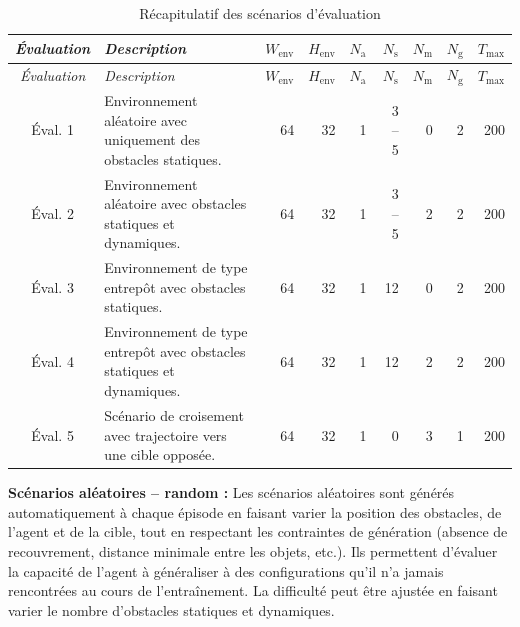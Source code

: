 \begin{longtable}{c p{6.5cm} r r r r r r r}

    \caption{Récapitulatif des scénarios d'évaluation} \label{tab:eval_scenarios}                                                                                                                                             \\
    \toprule
    \textit{Évaluation} & \textit{Description}                                                   & $W_{\text{env}}$ & $H_{\text{env}}$ & $N_{\text{a}}$ & $N_{\text{s}}$ & $N_{\text{m}}$ & $N_{\text{g}}$ & $T_{\text{max}}$ \\
    \midrule
    \endfirsthead
    \toprule
    \textit{Évaluation} & \textit{Description}                                                   & $W_{\text{env}}$ & $H_{\text{env}}$ & $N_{\text{a}}$ & $N_{\text{s}}$ & $N_{\text{m}}$ & $N_{\text{g}}$ & $T_{\text{max}}$ \\
    \midrule
    \endhead
    \midrule
    \endfoot
    \bottomrule
    \endlastfoot

    Éval. 1             & Environnement aléatoire avec uniquement des obstacles statiques.       & 64               & 32               & 1              & 3 -- 5         & 0              & 2              & 200              \\
    \midrule
    Éval. 2             & Environnement aléatoire avec obstacles statiques et dynamiques.        & 64               & 32               & 1              & 3 -- 5         & 2              & 2              & 200              \\
    \midrule
    Éval. 3             & Environnement de type entrepôt avec obstacles statiques.               & 64               & 32               & 1              & 12             & 0              & 2              & 200              \\
    \midrule
    Éval. 4             & Environnement de type entrepôt avec obstacles statiques et dynamiques. & 64               & 32               & 1              & 12             & 2              & 2              & 200              \\
    \midrule
    Éval. 5             & Scénario de croisement avec trajectoire vers une cible opposée.        & 64               & 32               & 1              & 0              & 3              & 1              & 200              \\
\end{longtable}

\noindent \textbf{Scénarios aléatoires -- random :} Les scénarios aléatoires sont générés automatiquement à chaque épisode en faisant varier la position des obstacles, de l'agent et de la cible, tout en respectant les contraintes de génération (absence de recouvrement, distance minimale entre les objets, etc.). Ils permettent d'évaluer la capacité de l'agent à généraliser à des configurations qu'il n'a jamais rencontrées au cours de l'entraînement. La difficulté peut être ajustée en faisant varier le nombre d'obstacles statiques et dynamiques.

